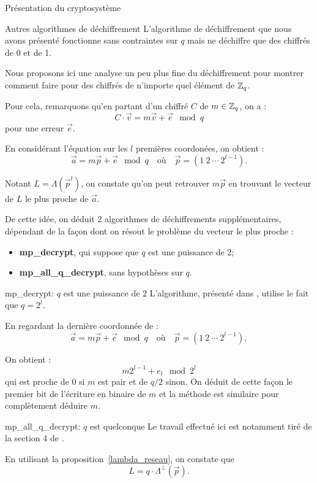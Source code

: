 \begin{section}{Présentation du cryptosystème}
\begin{subsection}{Autres algorithmes de déchiffrement}
	L'algorithme de déchiffrement que nous avons présenté fonctionne sans contraintes sur $q$ mais ne déchiffre que des chiffrés de 0 et de 1.

	Nous proposons ici une analyse un peu plus fine du déchiffrement pour montrer comment faire pour des chiffrés de n'importe quel élément de $\mathbb{Z}_q$.

	Pour cela, remarquons qu'en partant d'un chiffré  $C$ de $m \in \mathbb{Z}_q$, on a :
	\[ C \cdot \vec{v} = m \vec{v} + \vec{e} \mod q \]
	pour une erreur $\vec{e}$.
	
	En considérant l'équation sur les $l$ premières coordonées, on obtient :
	\[\vec{a} = m \vec{p} + \vec{e} \mod q\quad \text{où}\quad \vec{p} = (1\:2\:\cdots\:2^{l-1}). \]
 
	Notant $L = \Lambda(\vec{p}^t)$, on constate qu'on peut retrouver $m\vec{p}$ en trouvant le vecteur de $L$ le plus proche de $\vec{a}$.

	De cette idée, on déduit 2 algorithmes de déchiffrements supplémentaires, dépendant de la façon dont on résout le problème du vecteur le plus proche :

\begin{itemize}
\item \textbf{mp\_decrypt}, qui suppose que $q$ est une puissance de 2;
\item \textbf{mp\_all\_q\_decrypt}, sans hypothèses sur $q$.
\end{itemize}

\begin{subsubsection}{mp\_decrypt: $q$ est une puissance de $2$}
	L'algorithme, présenté dans \cite{EPRINT:GenSahWat13}, utilise le fait que $q = 2^l$.

	En regardant la dernière coordonnée de :
\[\vec{a} = m \vec{p} + \vec{e} \mod q\quad \text{où}\quad \vec{p} = (1\:2\:\cdots\:2^{l-1}), \]
 
	On obtient :
\[m 2^{l-1} + e_{l} \mod 2^l \]
	qui est proche de 0 si $m$ est pair et de $q/2$ sinon. On déduit de cette façon le premier bit de l'écriture en binaire de $m$ et la méthode est similaire pour complètement déduire $m$.
	
\end{subsubsection}
\begin{subsubsection}{mp\_all\_q\_decrypt: $q$ est quelconque}
	Le travail effectué ici est notamment tiré de la section 4 de \cite{EC:MicPei12}.

	En utilisant la proposition~\ref{lambda_reseau}, on constate que
\[ L = q \cdot \Lambda^\bot\left(\vec{p}\right). \]


\end{subsubsection}
\end{subsection}
\end{section}
